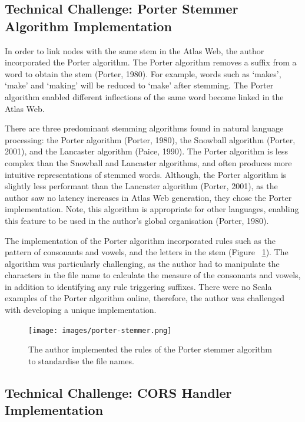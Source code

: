 \documentclass{article}
\begin{document}
\newpage

\subsection{Technical Challenge: Porter Stemmer Algorithm Implementation}

In order to link nodes with the same stem in the Atlas Web, the author incorporated the Porter algorithm. The Porter algorithm removes a suffix from a word to obtain the stem (Porter, 1980). For example, words such as ‘makes’, ‘make’ and ‘making’ will be reduced to ‘make’ after stemming. The Porter algorithm enabled different inflections of the same word become linked in the Atlas Web.

There are three predominant stemming algorithms found in natural language processing: the Porter algorithm (Porter, 1980), the Snowball algorithm (Porter, 2001), and the Lancaster algorithm (Paice, 1990). The Porter algorithm is less complex than the Snowball and Lancaster algorithms, and often produces more intuitive representations of stemmed words. Although, the Porter algorithm is slightly less performant than the Lancaster algorithm (Porter, 2001), as the author saw no latency increases in Atlas Web generation, they chose the Porter implementation. Note, this algorithm is appropriate for other languages, enabling this feature to be used in the author's global organisation (Porter, 1980).

The implementation of the Porter algorithm incorporated rules such as the pattern of consonants and vowels, and the letters in the stem (Figure ~\ref{fig:porter}). The algorithm was particularly challenging, as the author had to manipulate the characters in the file name to calculate the measure of the consonants and vowels, in addition to identifying any rule triggering suffixes. There were no Scala examples of the Porter algorithm online, therefore, the author was challenged with developing a unique implementation.

\begin{figure}[!hb]
  \centering
      \texttt{[image: images/porter-stemmer.png]}
  \caption{The author implemented the rules of the Porter stemmer algorithm to standardise the file names.}
  \label{fig:porter}
\end{figure}

\clearpage

\subsection{Technical Challenge: CORS Handler Implementation}
\end{document}

